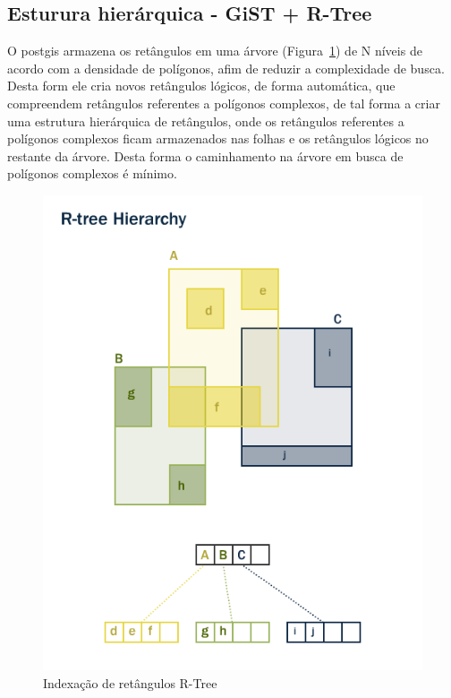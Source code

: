 \documentclass[12pt]{article}
\begin{document}
\subsection{Esturura hierárquica - GiST + R-Tree}
O postgis armazena os retângulos em uma árvore (Figura~\ref{fig:indexes_rtree}) de N
níveis de acordo com a densidade de polígonos, afim de reduzir a complexidade de busca.
Desta form ele cria novos retângulos lógicos, de forma automática, que compreendem
retângulos referentes a polígonos complexos, de tal forma a criar uma estrutura hierárquica
de retângulos, onde os retângulos referentes a polígonos complexos ficam armazenados nas
folhas e os retângulos lógicos no restante da árvore. Desta forma o caminhamento na árvore
em busca de polígonos complexos é mínimo.
\begin{figure}[ht]
  \centering
  \includegraphics[width=.5\textwidth]{indexes_rtree.png}
  \caption{Indexação de retângulos R-Tree}
  \label{fig:indexes_rtree}
\end{figure}



\end{document}

